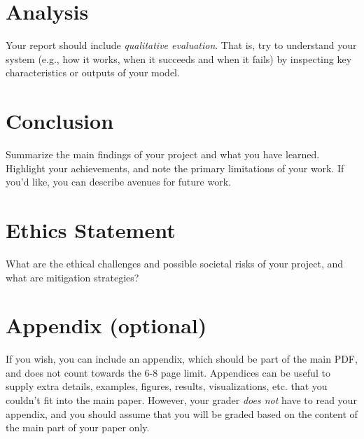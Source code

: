 \documentclass{article}
\begin{document}
\section{Analysis}
Your report should include \textit{qualitative evaluation}. That is, try to understand your system (e.g., how it works, when it succeeds and when it fails) by inspecting key characteristics or outputs of your model.

\section{Conclusion}
Summarize the main findings of your project and what you have learned. Highlight your achievements, and note the primary limitations of your work. If you'd like, you can describe avenues for future work.

\section{Ethics Statement}
What are the ethical challenges and possible societal risks of your project, and
what are mitigation strategies?




\appendix

\section{Appendix (optional)}
If you wish, you can include an appendix, which should be part of the main PDF, and does not count towards the 6-8 page limit.
Appendices can be useful to supply extra details, examples, figures, results, visualizations, etc. that you couldn't fit into the main paper. However, your grader \textit{does not} have to read your appendix, and you should assume that you will be graded based on the content of the main part of your paper only.
\end{document}
